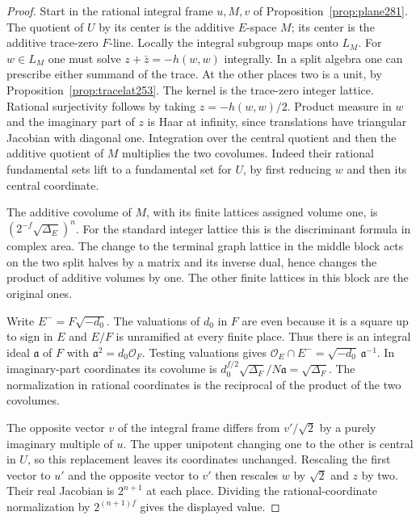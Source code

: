 \documentclass[a4paper,11pt]{article}
\theoremstyle{definition}
\theoremstyle{remark}
\numberwithin{equation}{section}
\begin{document}
\begin{proof}
Start in the rational integral frame \(u,M,v\) of
Proposition~\ref{prop:plane281}. The quotient of \(U\) by
its center is the additive \(E\)-space \(M\); its center is
the additive trace-zero \(F\)-line. Locally the integral
subgroup maps onto \(L_M\). For \(w\in L_M\) one must solve
\(z+\bar z=-h(w,w)\) integrally. In a split algebra one
can prescribe either summand of the trace. At the other
places two is a unit, by Proposition~\ref{prop:tracelat253}.
The kernel is the trace-zero integer lattice.
Rational surjectivity follows by taking \(z=-h(w,w)/2\).
Product measure in \(w\) and the imaginary part of \(z\)
is Haar at infinity, since translations have triangular
Jacobian with diagonal one. Integration over the central
quotient and then the additive quotient of \(M\) multiplies
the two covolumes. Indeed their rational fundamental sets
lift to a fundamental set for \(U\), by first reducing \(w\)
and then its central coordinate.

The additive covolume of \(M\), with its finite lattices
assigned volume one, is \((2^{-f}\sqrt{\Delta_E})^n\).
For the standard integer lattice this is the discriminant
formula in complex area. The change to the terminal graph
lattice in the middle block acts on the two split halves
by a matrix and its inverse dual, hence changes the product
of additive volumes by one. The other finite lattices
in this block are the original ones.

Write \(E^-=F\sqrt{-d_0}\). The valuations of \(d_0\) in
\(F\) are even because it is a square up to sign in \(E\)
and \(E/F\) is unramified at every finite place. Thus there
is an integral ideal \(\mathfrak a\) of \(F\) with
\(\mathfrak a^2=d_0\mathcal O_F\). Testing valuations gives
\(\mathcal O_E\cap E^-=\sqrt{-d_0}\,\mathfrak a^{-1}\).
In imaginary-part coordinates its covolume is
\(d_0^{f/2}\sqrt{\Delta_F}/N\mathfrak a=\sqrt{\Delta_F}\).
The normalization in rational coordinates is the reciprocal
of the product of the two covolumes.

The opposite vector \(v\) of the integral frame differs from
\(v'/\sqrt2\) by a purely imaginary multiple of \(u\).
The upper unipotent changing one to the other is central
in \(U\), so this replacement leaves its coordinates unchanged.
Rescaling the first vector to \(u'\) and the opposite vector
to \(v'\) then rescales \(w\) by \(\sqrt2\) and \(z\) by two.
Their real Jacobian is \(2^{n+1}\) at each place. Dividing
the rational-coordinate normalization by \(2^{(n+1)f}\)
gives the displayed value.
\end{proof}
\end{document}
